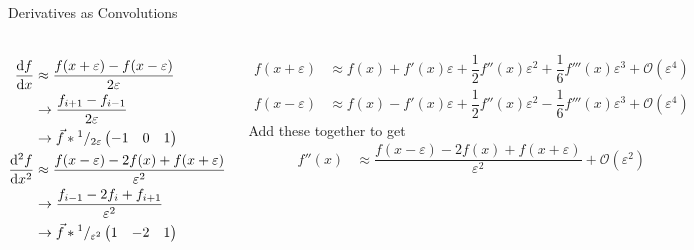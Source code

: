\begin{frame}{Derivatives as Convolutions}
%
\begin{columns}
\small
\begin{align*}
	\dv{f}{x}%
&\approx
	\dfrac
		{f(x + \varepsilon) - f(x - \varepsilon)}
		{2\varepsilon}
	\\
&\to
	\dfrac
		{f_{i+1} - f_{i-1}}
		{2\varepsilon}
	\\
&\to
	\vec{f} \ast {}^{1}/_{2\varepsilon}
	\begin{pmatrix}
	-1 & 0 & 1
	\end{pmatrix}
\\
	\dv[2]{f}{x}
&\approx
	\dfrac
		{f(x - \varepsilon) -2 f(x) + f(x + \varepsilon)}
		{\varepsilon^2}
	\\
&\to
	\dfrac
		{f_{i-1} - 2 f_i + f_{i+1}}
		{\varepsilon^2}
	\\
&\to
	\vec{f} \ast {}^{1}/_{\varepsilon^2}
	\begin{pmatrix}
	1 & -2 & 1
	\end{pmatrix}
\end{align*}
%
\begin{defbox}[2$^{nd}$ Derivative -- Proof, leftupper=1mm]
\scriptsize
\begin{align*}
f(x + \varepsilon) &\approx
	f(x) + f'(x)\varepsilon + \dfrac{1}{2}f''(x)\varepsilon^2 + \dfrac{1}{6}f'''(x)\varepsilon^3 + \mathcal{O}(\varepsilon^4)
\\
f(x - \varepsilon) &\approx
	f(x) - f'(x)\varepsilon + \dfrac{1}{2}f''(x)\varepsilon^2 - \dfrac{1}{6}f'''(x)\varepsilon^3 + \mathcal{O}(\varepsilon^4)
\end{align*}
Add these together to get
\begin{align*}
f''(x) &\approx
	\dfrac
		{f(x - \varepsilon) - 2f(x) + f(x + \varepsilon)}
		{\varepsilon^2}
	+ \mathcal{O}(\varepsilon^2)
\end{align*}
\end{defbox}
\end{columns}
%
\end{frame}


